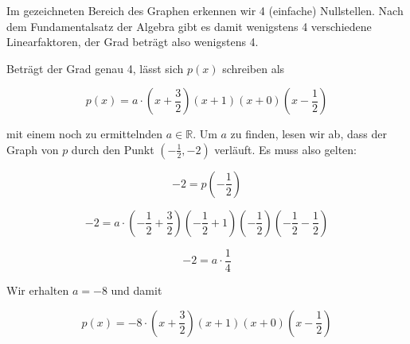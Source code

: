 \item Im gezeichneten Bereich des Graphen erkennen wir 4 (einfache) Nullstellen. Nach dem Fundamentalsatz der Algebra gibt es damit wenigstens 4 verschiedene Linearfaktoren, der Grad beträgt also wenigstens 4.

Beträgt der Grad genau 4, lässt sich $p(x)$ schreiben als

$$p(x) = a\cdot(x+\frac{3}{2})(x+1)(x+0)(x-\frac{1}{2})$$

mit einem noch zu ermittelnden $a \in \mathbb{R}$. Um $a$ zu finden, lesen wir ab, dass der Graph von $p$ durch den Punkt $(-\frac{1}{2}, -2)$ verläuft. Es muss also gelten:

$$-2 = p(-\frac{1}{2})$$

$$-2 = a\cdot(-\frac{1}{2}+\frac{3}{2})(-\frac{1}{2}+1)(-\frac{1}{2})(-\frac{1}{2}-\frac{1}{2})$$

$$-2 = a\cdot \frac{1}{4}$$

Wir erhalten $a=-8$ und damit

$$p(x) = -8\cdot(x+\frac{3}{2})(x+1)(x+0)(x-\frac{1}{2})$$
